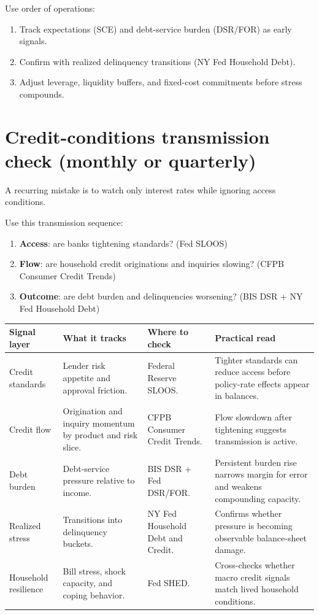 \documentclass[11pt,openany]{book}
\begin{document}
Use order of operations:

\begin{enumerate}
  \item Track expectations (SCE) and debt-service burden (DSR/FOR) as early signals.
  \item Confirm with realized delinquency transitions (NY Fed Household Debt).
  \item Adjust leverage, liquidity buffers, and fixed-cost commitments before stress compounds.
\end{enumerate}

\section{Credit-conditions transmission check (monthly or quarterly)}

A recurring mistake is to watch only interest rates while ignoring access conditions.

Use this transmission sequence:

\begin{enumerate}
  \item \textbf{Access}: are banks tightening standards? (Fed SLOOS)
  \item \textbf{Flow}: are household credit originations and inquiries slowing? (CFPB Consumer Credit Trends)
  \item \textbf{Outcome}: are debt burden and delinquencies worsening? (BIS DSR + NY Fed Household Debt)
\end{enumerate}

\begin{center}
\small
\begin{tabularx}{\textwidth}{>{\raggedright\arraybackslash}p{}>{\raggedright\arraybackslash}p{}>{\raggedright\arraybackslash}p{}X}
\toprule
\textbf{Signal layer} & \textbf{What it tracks} & \textbf{Where to check} & \textbf{Practical read} \\
\midrule
Credit standards & Lender risk appetite and approval friction. & Federal Reserve SLOOS. & Tighter standards can reduce access before policy-rate effects appear in balances. \\
Credit flow & Origination and inquiry momentum by product and risk slice. & CFPB Consumer Credit Trends. & Flow slowdown after tightening suggests transmission is active. \\
Debt burden & Debt-service pressure relative to income. & BIS DSR + Fed DSR/FOR. & Persistent burden rise narrows margin for error and weakens compounding capacity. \\
Realized stress & Transitions into delinquency buckets. & NY Fed Household Debt and Credit. & Confirms whether pressure is becoming observable balance-sheet damage. \\
Household resilience & Bill stress, shock capacity, and coping behavior. & Fed SHED. & Cross-checks whether macro credit signals match lived household conditions. \\
\bottomrule
\end{tabularx}
\normalsize
\end{center}
\end{document}
